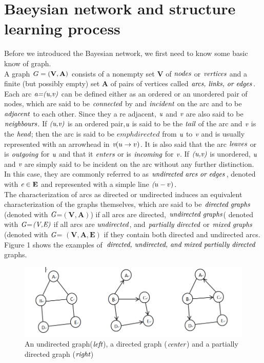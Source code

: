 \documentclass[12pt]{article}
\theoremstyle{plain}
\begin{document}
\section{Baeysian network and structure learning process}
Before we introduced the Bayesian network, we first need to know some basic know of graph.\\
A graph $G=(\bf{V},\bf{A})$ consists of a nonempty set $\mathbf{V}$ of $\emph{nodes}$ or $\emph{vertices}$ and a finite (but possibly empty) set $\mathbf{A}$ of pairs of vertices called $\emph{arcs, links, or edges}$.\\
Each arc $\emph{a=(u,v)}$ can be defined either as an ordered or an unordered pair of nodes, which are said to be $\emph{connected}$ by and $\emph{incident}$ on the arc and to be $\emph{adjacent}$ to each other. Since they a re adjacent, $\emph{u}$ and $\emph{v}$ are also said to be $\emph{neighbours}$. If $\emph{(u,v)}$ is an ordered pair,$\emph{u}$ is said to be the $\emph{tail}$ of the arc and $\emph{v}$ is the $\emph{head}$; then the arc is said to be $emph{directed}$ from $\emph{u}$ to $\emph{v}$ and is usually represented with an arrowhead in $\emph{v}(u \rightarrow v)$. It is also said that the arc $\emph{leaves}$ or is $\emph{outgoing}$ for $\emph{u}$ and that it $\emph{enters}$ or is $\emph{incoming}$ for $\emph{v}$. If $\emph{(u,v)}$ is unordered, $\emph{u}$ and $\emph{v}$ are simply said to be incident on the arc without any further distinction. In this case, they are commonly referred to as $\emph{undirected arcs or edges}$, denoted with $\emph{e} \in \mathbf{E}$ and represented with a simple line $\emph(u-v)$.\\
The characterization of arcs as directed or undirected induces an equivalent characterization of the graphs themselves, which are said to be $\emph{directed graphs}$ (denoted with $\emph{G}$=$(\mathbf{V},\mathbf{A})$) if all arcs are directed, $\emph{undirected graphs}$( denoted with $\emph{G}$=$\emph{(V,E)}$ if all arcs are $\emph{undirected}$, and $\emph{partially directed}$ or $\emph{mixed graphs}$ (denoted with $\emph{G}$= $\mathbf{(V,A,E)}$ if they contain both directed and undirected arcs.\\

Figure 1 shows the examples of $\emph{directed, undirected, and mixed partially directed}$ graphs. \\
\begin{figure}[!htb]
\centering
\includegraphics[scale=0.50]{1.png}
\caption{\label{graph:pdf1} An undirected graph($\emph{left}$), a directed graph ($\emph{center}$) and a partially directed graph ($\emph{right}$)}
\end{figure}
\end{document}
